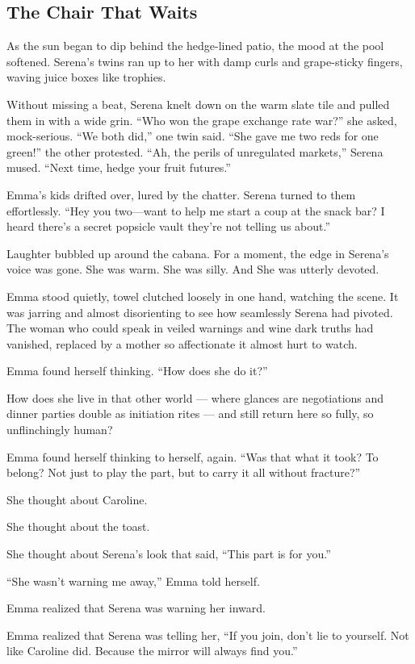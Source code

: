 
\subsection{The Chair That Waits}

As the sun began to dip behind the hedge-lined patio, the mood at the pool softened. Serena’s twins ran up to 
her with damp curls and grape-sticky fingers, waving juice boxes like trophies.

Without missing a beat, Serena knelt down on the warm slate tile and pulled them in with a wide grin.
``Who won the grape exchange rate war?'' she asked, mock-serious.
``We both did,'' one twin said.
``She gave me two reds for one green!'' the other protested.
``Ah, the perils of unregulated markets,'' Serena mused. ``Next time, hedge your fruit futures.''

Emma’s kids drifted over, lured by the chatter. Serena turned to them effortlessly.
``Hey you two—want to help me start a coup at the snack bar? I heard there’s a secret popsicle vault 
they’re not telling us about.''

Laughter bubbled up around the cabana. For a moment, the edge in Serena’s voice was gone. She was warm. 
She was silly. And She was utterly devoted.

Emma stood quietly, towel clutched loosely in one hand, watching the scene.
It was jarring and almost disorienting to see how seamlessly Serena had pivoted.
The woman who could speak in veiled warnings and wine dark truths had vanished, replaced by a mother 
so affectionate it almost hurt to watch.

Emma found herself thinking. ``How does she do it?''

How does she live in that other world --- where glances are negotiations and dinner parties double as 
initiation rites --- and still return here so fully, so unflinchingly human?

Emma found herself thinking to herself, again. ``Was that what it took? To belong?
Not just to play the part, but to carry it all without fracture?''

She thought about Caroline. 

She thought about the toast.

She thought about Serena’s look that said, “This part is for you.”

``She wasn’t warning me away,'' Emma told herself.

Emma realized that Serena was warning her inward.

Emma realized that Serena was telling her, ``If you join, don’t lie to yourself. Not like Caroline did. Because the mirror 
will always find you.''

